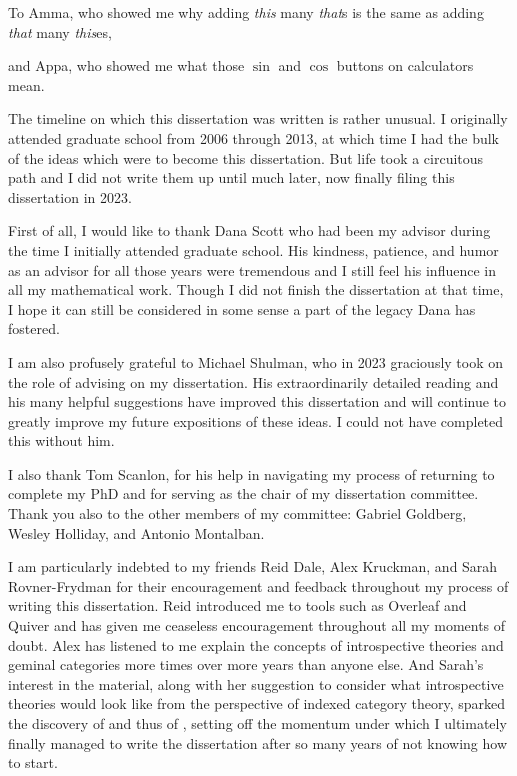 \documentclass{ucbthesis}
\begin{document}
\begin{frontmatter}

\begin{dedication}
\null\vfil
\begin{center}
To Amma, who showed me why adding \textit{this} many \textit{that}s is the same as adding \textit{that} many \textit{this}es,
\\\vspace{12pt}

and Appa, who showed me what those $\sin$ and $\cos$ buttons on calculators mean.

\end{center}
\vfil\null
\end{dedication}

\begin{acknowledgements}
The timeline on which this dissertation was written is rather unusual. I originally attended graduate school from 2006 through 2013, at which time I had the bulk of the ideas which were to become this dissertation. But life took a circuitous path and I did not write them up until much later, now finally filing this dissertation in 2023.

First of all, I would like to thank Dana Scott who had been my advisor during the time I initially attended graduate school. His kindness, patience, and humor as an advisor for all those years were tremendous and I still feel his influence in all my mathematical work. Though I did not finish the dissertation at that time, I hope it can still be considered in some sense a part of the legacy Dana has fostered.

I am also profusely grateful to Michael Shulman, who in 2023 graciously took on the role of advising on my dissertation. His extraordinarily detailed reading and his many helpful suggestions have improved this dissertation and will continue to greatly improve my future expositions of these ideas. I could not have completed this without him.

I also thank Tom Scanlon, for his help in navigating my process of returning to complete my PhD and for serving as the chair of my dissertation committee. Thank you also to the other members of my committee: Gabriel Goldberg, Wesley Holliday, and Antonio Montalban.

I am particularly indebted to my friends Reid Dale, Alex Kruckman, and Sarah Rovner-Frydman for their encouragement and feedback throughout my process of writing this dissertation. Reid introduced me to tools such as Overleaf and Quiver and has given me ceaseless encouragement throughout all my moments of doubt. Alex has listened to me explain the concepts of introspective theories and geminal categories more times over more years than anyone else. And Sarah's interest in the material, along with her suggestion to consider what introspective theories would look like from the perspective of indexed category theory, sparked the discovery of  and thus of , setting off the momentum under which I ultimately finally managed to write the dissertation after so many years of not knowing how to start.


\end{acknowledgements}
\end{frontmatter}
\end{document}
